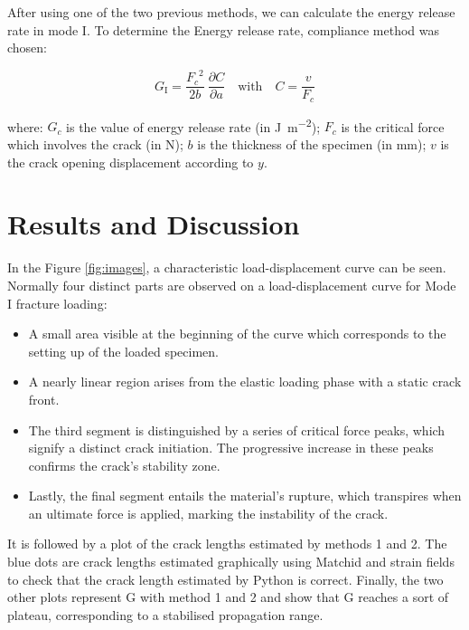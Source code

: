 \documentclass[3p,times,procedia]{elsarticle}
\begin{document}
After using one of the two previous methods, we can calculate the energy release rate in mode I. To determine the Energy release rate, compliance method was chosen:

\begin{equation}
	G_\text{I}=\displaystyle\frac{{F_{c}}^2}{2b}\ \frac{\partial C}{\partial a} \quad \text{with} \quad C=\frac{v}{F_{c}} 	
	\label{eq:Energy release rate equation}
\end{equation} 
 
\noindent where: $G_c$ is the value of energy release rate (in \si{\joule\per\square\meter}); $F_c$ is the critical force which involves the crack (in \si{\newton}); $b$ is the thickness of the specimen (in \si{\milli\meter}); $v$ is the crack opening displacement according to $y$.


\section{Results and Discussion}\label{S:res}


In the Figure \ref{fig:images}, a characteristic load-displacement curve can be seen. Normally four distinct parts are observed on a load-displacement curve for Mode I fracture loading:

\begin{itemize}
	\item A small area visible at the beginning of the curve which corresponds to the setting up of the loaded specimen. 
	\item A nearly linear region arises from the elastic loading phase with a static crack front.
	\item The third segment is distinguished by a series of critical force peaks, which signify a distinct crack initiation. The progressive increase in these peaks confirms the crack's stability zone.
	\item Lastly, the final segment entails the material's rupture, which transpires when an ultimate force is applied, marking the instability of the crack.
\end{itemize}

It is followed by a plot of the crack lengths estimated by methods 1 and 2. The blue dots are crack lengths estimated graphically using Matchid and strain fields to check that the crack length estimated by Python is correct. Finally, the two other plots represent G with method 1 and 2 and show that G reaches a sort of plateau, corresponding to a stabilised propagation range.
\end{document}
